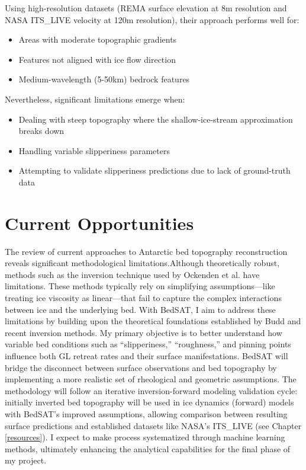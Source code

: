 Using high-resolution datasets (REMA surface elevation at 8m resolution and NASA ITS\_LIVE velocity at 120m resolution), their approach performs well for:
\begin{itemize}
    \item Areas with moderate topographic gradients
    \item Features not aligned with ice flow direction
    \item Medium-wavelength (5-50km) bedrock features
\end{itemize}
\newpage
Nevertheless, significant limitations emerge when:
\begin{itemize}
    \item Dealing with steep topography where the shallow-ice-stream approximation breaks down
    \item Handling variable slipperiness parameters
    \item Attempting to validate slipperiness predictions due to lack of ground-truth data
\end{itemize}


\section{Current Opportunities}

The review of current approaches to Antarctic bed topography reconstruction reveals significant methodological limitations.Although theoretically robust, methods such as the inversion technique used by Ockenden et al. have limitations. These methods typically rely on simplifying assumptions—like treating ice viscosity as linear—that fail to capture the complex interactions between ice and the underlying bed.
With BedSAT, I aim to address these limitations by building upon the theoretical foundations established by Budd and recent inversion methods. My primary objective is to better understand how variable bed conditions such as ``slipperiness,'' ``roughness,'' and pinning points influence both GL retreat rates and their surface manifestations. BedSAT will bridge the disconnect between surface observations and bed topography by implementing a more realistic set of rheological and geometric assumptions. The methodology will follow an iterative inversion-forward modeling validation cycle: initially inverted bed topography will be used in ice dynamics (forward) models with BedSAT's improved assumptions, allowing comparison between resulting surface predictions and established datasets like NASA's ITS\_LIVE (see Chapter \ref{resources}). I expect to make process systematized through machine learning methods, ultimately enhancing the analytical capabilities for the final phase of my project.

